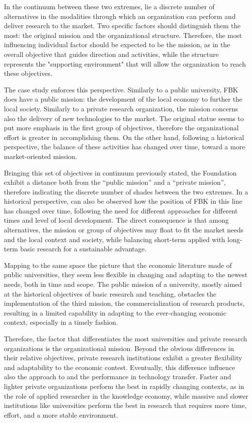 In the continuum between these two extremes, lie a discrete number of alternatives in the modalities through which an organization can perform and deliver research to the market. Two specific factors should distinguish them the most: the original mission and the organizational structure. Therefore, the most influencing individual factor should be expected to be the mission, as in the overall objective that guides direction and activities, while the structure represents the "supporting environment" that will allow the organization to reach these objectives. 

The case study enforces this perspective. Similarly to a public university, FBK does have a public mission: the development of the local economy to further the local society. Similarly to a private research organization, the mission concerns also the delivery of new technologies to the market. The original statue seems to put more emphasis in the first group of objectives, therefore the organizational effort is greater in accomplishing them. On the other hand, following a historical perspective, the balance of these activities has changed over time, toward a more market-oriented mission.

Bringing this set of objectives in continuum previously stated, the Foundation exhibit a distance both from the \enquote{public mission} and a \enquote{private mission}, therefore indicating the discrete number of shades between the two extremes. In a historical perspective, can also be observed how the position of FBK in this line has changed over time, following the need for different approaches for different times and level of local development. The direct consequence is that among alternatives, the mission or group of objectives may float to fit the market needs and the local context and society, while balancing short-term applied with long-term basic research for a sustainable advantage.

Mapping to the same space the picture that the economic literature made of public universities, they seem less flexible in changing and adapting to the newest needs, both in time and scope. The public mission of a university, mostly aimed at the historical objectives of basic research and teaching, obstacles the implementation of the third mission, the commercialization of research products, resulting in a limited capability in adapting to the ever-changing economic context, especially in a timely fashion.

Therefore, the factor that differentiates the most universities and private research organizations is the organizational mission. Beyond the obvious differences in their relative objectives, private research institutions exhibit a greater flexibility and adaptability to the economic contest. Eventually, this difference influence also the approach to and the performance in technology transfer. Faster and lighter private organizations perform the best in rapidly changing contexts, as in the role of applied researcher in the knowledge economy, while massive and slower institutions like universities perform the best in research that requires more time, effort, and a more stable environment.

